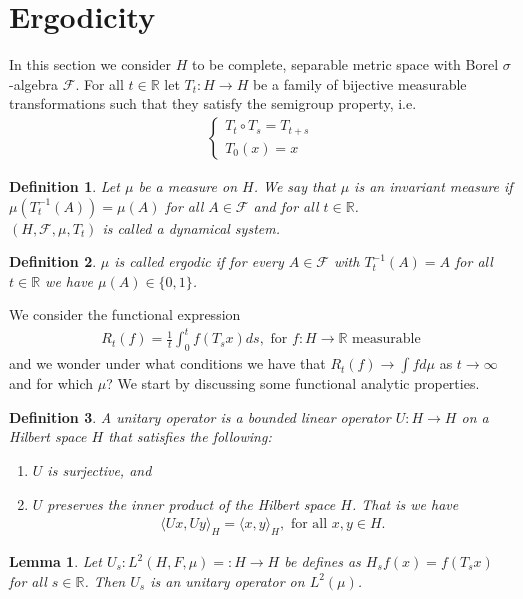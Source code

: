 \documentclass[11pt,a4paper, final]{article}
\newtheorem{lem}{Lemma}[section]
\newtheorem{defn}{Definition}[section]
\theoremstyle{definition}
\begin{document}
\section{Ergodicity}
In this section we consider $H$ to be complete, separable metric space with Borel $\sigma$-algebra $\mathcal{F}$. For all $t \in \mathbb{R}$ let $T_t : H \to H$ be a family of bijective measurable transformations such that they satisfy the semigroup property, i.e.
\begin{align*}
\begin{cases} T_t \circ T_s = T_{t+s} \\ T_0(x) = x \end{cases}
\end{align*}
\begin{defn} Let $\mu$ be a measure on $H$. We say that $\mu$ is an invariant measure if $\mu (T_t^{-1}(A))= \mu (A)$ for all $A \in \mathcal{F}$ and for all $t \in \mathbb{R}$. \\  $(H, \mathcal{F},  \mu , T_t) $ is called a dynamical system. 
\end{defn}
\begin{defn} $\mu$ is called ergodic if for every $A \in \mathcal{F}$ with $T_t^{-1}(A)=A$ for all $t \in \mathbb{R}$ we have  $\mu(A) \in \lbrace 0 ,1 \rbrace $. 
\end{defn}
\noindent We consider the functional expression
\begin{align*}
R_t(f) = \frac{1}{t} \int_0^t f(T_sx)ds, \text{ for } f : H \to \mathbb{R} \text{ measurable}
\end{align*}
and we wonder under what conditions we have that $R_t(f) \to \int f d \mu$ as $t \to \infty$ and for which $\mu$? We start by discussing some functional analytic properties.
\begin{defn} A unitary operator is a bounded linear operator $U: H \to H$ on a Hilbert space $H$ that satisfies the following:
\begin{enumerate}
\item $U$ is surjective, and 
\item $U$ preserves the inner product of the Hilbert space $H$. That is we have 
\begin{align*}
\langle Ux, Uy \rangle_H = \langle x, y \rangle_H, \text{ for all } x,y \in H. 
\end{align*}
\end{enumerate}
\end{defn}
\begin{lem} Let $U_s : L^2(H, F, \mu)=:H \to H$ be defines as $H_sf(x)=f(T_sx)$ for all $s \in \mathbb{R}$. Then $U_s$ is an unitary operator on $L^2( \mu)$.
\end{lem}
\end{document}
